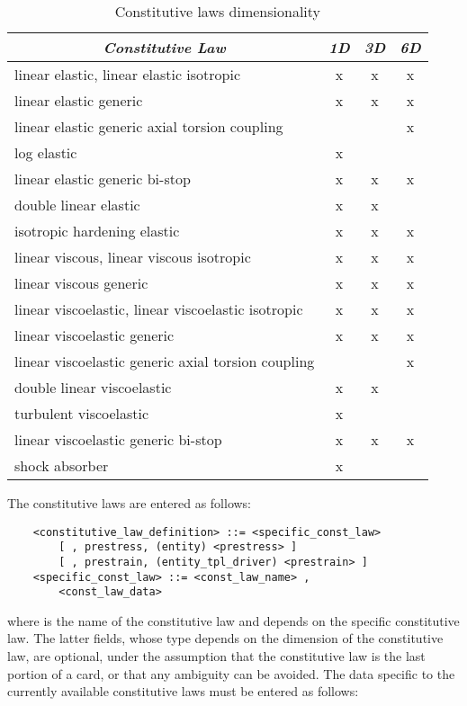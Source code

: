 \begin{table}[h]
    \newlength{\constlawwidth}
    \setlength{\constlawwidth}{70mm}
    \centering
    \caption{Constitutive laws dimensionality}\label{tab:CONST-LAW-DIM}
    \begin{tabular}{l|c|c|c} 
        \hline
        \multicolumn{1}{c}{\textbf{\emph{Constitutive Law}}} &
	\multicolumn{1}{c}{\textbf{\emph{1D}}} &
	\multicolumn{1}{c}{\textbf{\emph{3D}}} &
	\multicolumn{1}{c}{\textbf{\emph{6D}}} \\ 
	\hline
	linear elastic, linear elastic isotropic               & x & x & x \\
	linear elastic generic                                 & x & x & x \\
	linear elastic generic axial torsion coupling          &   &   & x \\
	log elastic                                            & x &   &   \\
	linear elastic generic bi-stop                         & x & x & x \\
	double linear elastic                                  & x & x &   \\
	isotropic hardening elastic                            & x & x & x \\
	linear viscous, linear viscous isotropic               & x & x & x \\
	linear viscous generic                                 & x & x & x \\
	linear viscoelastic, linear viscoelastic isotropic     & x & x & x \\
	linear viscoelastic generic                            & x & x & x \\
	linear viscoelastic generic axial torsion coupling     &   &   & x \\
	double linear viscoelastic                             & x & x &   \\
	turbulent viscoelastic                                 & x &   &   \\
	linear viscoelastic generic bi-stop                    & x & x & x \\
	shock absorber                                         & x &   &   \\
	\hline
    \end{tabular}
\end{table}

\noindent 
The constitutive laws are entered as follows:
\begin{verbatim}
    <constitutive_law_definition> ::= <specific_const_law>
        [ , prestress, (entity) <prestress> ]
        [ , prestrain, (entity_tpl_driver) <prestrain> ]
    <specific_const_law> ::= <const_law_name> ,
        <const_law_data>
\end{verbatim}
where  is the name of the constitutive law and
 depends on the specific constitutive law. 
The latter fields, whose type depends on the dimension of the
constitutive law, are optional, under the assumption that the
constitutive law is the last portion of a card, or that any ambiguity 
can be avoided.
The data specific to the currently available constitutive laws must be
entered as follows:


